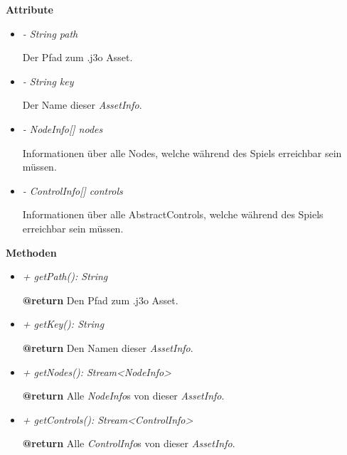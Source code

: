         \textbf{Attribute}
        \begin{itemize}
            \item \textit{- String path}
                \begin{leftbar}[0.9\linewidth]
                    Der Pfad zum .j3o Asset.
                \end{leftbar}
            \item \textit{- String key}
                \begin{leftbar}[0.9\linewidth]
                    Der Name dieser \textit{AssetInfo}.
                \end{leftbar}
            
            \pagebreak
            \item \textit{- NodeInfo[] nodes}
                \begin{leftbar}[0.9\linewidth]
                    Informationen über alle Nodes, welche während des Spiels erreichbar sein müssen.
                \end{leftbar}
            \item \textit{- ControlInfo[] controls}
                \begin{leftbar}[0.9\linewidth]
                    Informationen über alle AbstractControls, welche während des Spiels erreichbar sein müssen.
                \end{leftbar}
        \end{itemize}
        \textbf{Methoden}
        \begin{itemize}
            \item \textit{+ getPath(): String}
                \begin{leftbar}[0.9\linewidth]
                    \textbf{@return} Den Pfad zum .j3o Asset.
                \end{leftbar}
            \item \textit{+ getKey(): String}
                \begin{leftbar}[0.9\linewidth]
                    \textbf{@return} Den Namen dieser \textit{AssetInfo}.
                \end{leftbar}
            \item \textit{+ getNodes(): Stream<NodeInfo>}
                \begin{leftbar}[0.9\linewidth]
                    \textbf{@return} Alle \textit{NodeInfo}s von dieser \textit{AssetInfo}.
                \end{leftbar}
            \item \textit{+ getControls(): Stream<ControlInfo>}
                \begin{leftbar}[0.9\linewidth]
                    \textbf{@return} Alle \textit{ControlInfo}s von dieser \textit{AssetInfo}.
                \end{leftbar}
        \end{itemize}
        
